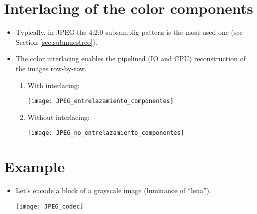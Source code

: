 \section{Interlacing of the color components}
\begin{itemize}
\item Typically, in JPEG the 4:2:0 subsamplig pattern is the most used
  one (see Section \ref{sec:submuestreo}).
\item The color interlacing enables the pipelined (IO and CPU)
  reconstruction of the images row-by-row.
  \begin{enumerate}
  \item With interlacing:
    \begin{center}
      \texttt{[image: JPEG\_entrelazamiento\_componentes]}
    \end{center}
    \newpage
  \item Without interlacing:
    \begin{center}
      \texttt{[image: JPEG\_no\_entrelazamiento\_componentes]}
    \end{center}
  \end{enumerate}
\end{itemize}

\section*{Example}
\begin{itemize}
\item Let's encode a block of a grayscale image (luminance of
  ``lena'').
  \begin{center}
    \texttt{[image: JPEG\_codec]}
  \end{center}
\end{itemize}

\newpage
